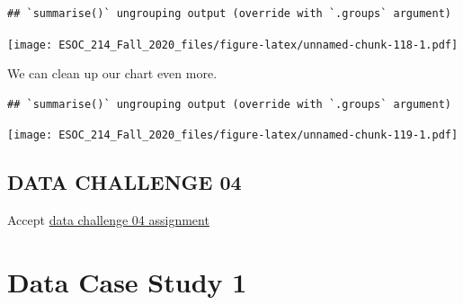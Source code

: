 \documentclass[
]{book}
\newenvironment{Shaded}{\begin{snugshade}}{\end{snugshade}}
\newcommand{\DataTypeTok}[1]{\textcolor[rgb]{0.13,0.29,0.53}{#1}}
\newcommand{\DecValTok}[1]{\textcolor[rgb]{0.00,0.00,0.81}{#1}}
\newcommand{\KeywordTok}[1]{\textcolor[rgb]{0.13,0.29,0.53}{\textbf{#1}}}
\newcommand{\NormalTok}[1]{#1}
\newcommand{\OperatorTok}[1]{\textcolor[rgb]{0.81,0.36,0.00}{\textbf{#1}}}
\newcommand{\StringTok}[1]{\textcolor[rgb]{0.31,0.60,0.02}{#1}}
\begin{document}
\begin{verbatim}
## `summarise()` ungrouping output (override with `.groups` argument)
\end{verbatim}

\texttt{[image: ESOC\_214\_Fall\_2020\_files/figure-latex/unnamed-chunk-118-1.pdf]}

We can clean up our chart even more.

\begin{Shaded}
\end{Shaded}

\begin{verbatim}
## `summarise()` ungrouping output (override with `.groups` argument)
\end{verbatim}

\texttt{[image: ESOC\_214\_Fall\_2020\_files/figure-latex/unnamed-chunk-119-1.pdf]}

\hypertarget{data-challenge-04}{%
\section{DATA CHALLENGE 04}\label{data-challenge-04}}

Accept \href{https://classroom.github.com/a/fYDB-CfS}{data challenge 04 assignment}

\hypertarget{data-case-study-1}{%
\chapter{Data Case Study 1}\label{data-case-study-1}}
\end{document}
